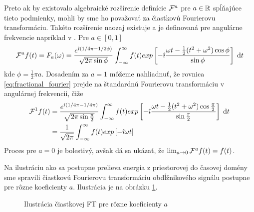 Preto ak by existovalo algebraické rozšírenie definície $\mathcal{F}^a$
pre $a\in {\mathbb R}$ spĺňajúce tieto
podmienky, mohli by sme ho považovať za čiastkovú Fourierovu
transformáciu. Takéto rozšírenie naozaj existuje a je definovaná pre angulárne
frekvencie napríklad v \cite{saxsin}.
Pre $a\in[0,1]$ 
\begin{equation}
    \mathcal{F}^a f(t) = F_a(\omega) =
        \frac{e^{\hat{\imath}( 1/4 \pi - 1/2 \phi)}}{\sqrt{2\pi \sin \phi}}
        \int_{-\infty}^{\infty} f(t) exp\left[ 
            -\hat{\imath} \frac{\omega t - \frac{1}{2}( t^2 + \omega^2)
            \cos\phi }{\sin \phi}
        \right] \; \mathrm{d} t
    \label{eq:fractional_fourier}
\end{equation}
kde $\phi = \frac{1}{2} \pi a$.
Dosadením za $a=1$ môžeme nahliadnuť, že rovnica
\eqref{eq:fractional_fourier} prejde na štandardnú Fourierovu
transformáciu v angulárnej frekvencii, čiže
\begin{equation*}
    \begin{split}
    \mathcal{F}^1 f(t) &=
        \frac{e^{\hat{\imath}( 1/4 \pi - 1/4 \pi)}}{\sqrt{2 \pi \sin \frac{\pi}{2}} }
        \int_{-\infty}^{\infty} f(t) exp\left[ 
            -\hat{\imath} \frac{\omega t - \frac{1}{2}( t^2 + \omega^2)
            \cos\frac{\pi}{2} }{\sin \frac{\pi}{2}}
        \right] \; \mathrm{d} t \\
        &= \frac{1}{\sqrt{2 \pi}} 
            \int_{-\infty}^{\infty} f(t) exp\left[ -\hat{\imath} \omega t\right]
        \end{split}
\end{equation*}
Proces pre $a=0$ je bolestivý, avšak dá sa ukázať, že
$\lim_{a\rightarrow0} \mathcal{F}^a f(t) = f(t)$.

Na ilustráciu ako sa postupne prelieva energia z priestorovej do
časovej domény sme spravili čiastkovú Fourierovu transformáciu
obdĺžnikového signálu postupne pre rôzne koeficienty $a$. Ilustrácia
je na obrázku \ref{fig:fractional_fourier_transform}.

\begin{figure}[htp]
    \def\imagepath{obrazky/transformacia/fractional_fourier_transform}
    \centering
    \label{fig:fractional_fourier_transform}
    \caption{Ilustrácia čiastkovej FT pre rôzne koeficienty $a$}
\end{figure}

